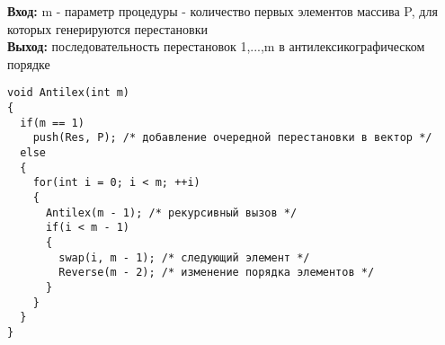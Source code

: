 \documentclass[10pt, a5paper]{article}
\begin{document}

\noindent\textbf{Вход:} m - параметр процедуры - количество первых элементов массива P,
для которых генерируются перестановки\\
\noindent\textbf{Выход:} последовательность перестановок 1,...,m в антилексикографическом порядке
\begin{lstlisting}
void Antilex(int m)
{
  if(m == 1)
    push(Res, P); /* добавление очередной перестановки в вектор */
  else
  {
    for(int i = 0; i < m; ++i)
    {
      Antilex(m - 1); /* рекурсивный вызов */
      if(i < m - 1)
      {
        swap(i, m - 1); /* следующий элемент */
        Reverse(m - 2); /* изменение порядка элементов */
      }
    }
  }
}
\end{lstlisting}
\end{document}
